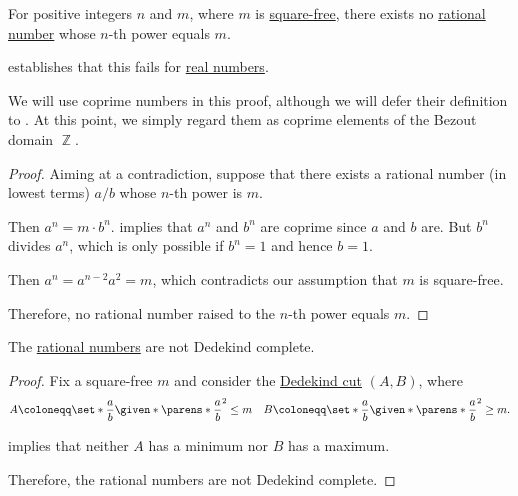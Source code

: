 \begin{proposition}\label{thm:nth_root_is_not_rational}
  For positive integers \( n \) and \( m \), where \( m \) is \hyperref[def:square_free_element]{square-free}, there exists no \hyperref[def:rational_numbers]{rational number} whose \( n \)-th power equals \( m \).
\end{proposition}
\begin{comments}
  \item {} establishes that this fails for \hyperref[def:real_numbers]{real numbers}.
  \item We will use coprime numbers in this proof, although we will defer their definition to . At this point, we simply regard them as coprime elements of the Bezout domain \( \BbbZ \).
\end{comments}
\begin{proof}
  Aiming at a contradiction, suppose that there exists a rational number (in lowest terms) \( a / b \) whose \( n \)-th power is \( m \).

  Then \( a^n = m \cdot b^n \).  implies that \( a^n \) and \( b^n \) are coprime since \( a \) and \( b \) are. But \( b^n \) divides \( a^n \), which is only possible if \( b^n = 1 \) and hence \( b = 1 \).

  Then \( a^n = a^{n - 2} a^2 = m \), which contradicts our assumption that \( m \) is square-free.

  Therefore, no rational number raised to the \( n \)-th power equals \( m \).
\end{proof}

\begin{corollary}\label{thm:rational_numbers_not_dedekind_complete}
  The \hyperref[def:rational_numbers]{rational numbers} are not Dedekind complete.
\end{corollary}
\begin{proof}
  Fix a square-free \( m \) and consider the \hyperref[def:dedekind_cut]{Dedekind cut} \( (A, B) \), where
  \begin{align*}
    A \coloneqq \set*{ \frac a b \given* \parens*{ \frac a b }^2 \leq m }
    &&
    B \coloneqq \set*{ \frac a b \given* \parens*{ \frac a b }^2 \geq m }.
  \end{align*}

   implies that neither \( A \) has a minimum nor \( B \) has a maximum.

  Therefore, the rational numbers are not Dedekind complete.
\end{proof}
